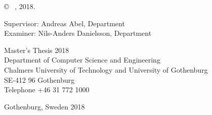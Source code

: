 \copyright ~ \me, 2018. \setlength{\parskip}{1cm}

Supervisor: Andreas Abel, Department\\
Examiner: Nils-Anders Danielsson, Department \setlength{\parskip}{1cm}

Master's Thesis 2018\\	%
Department of Computer Science and Engineering\\
Chalmers University of Technology and University of Gothenburg\\
SE-412 96 Gothenburg\\
Telephone +46 31 772 1000 \setlength{\parskip}{0.5cm}

\vfill

Gothenburg, Sweden 2018

